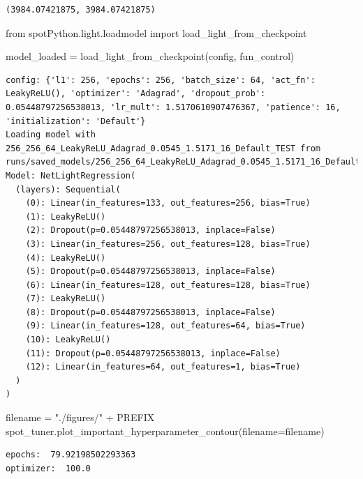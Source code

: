 \documentclass[
  letterpaper,
  DIV=11,
  numbers=noendperiod]{scrreprt}
\newenvironment{Shaded}{\begin{snugshade}}{\end{snugshade}}
\newcommand{\ImportTok}[1]{\textcolor[rgb]{0.00,0.46,0.62}{#1}}
\newcommand{\NormalTok}[1]{\textcolor[rgb]{0.00,0.23,0.31}{#1}}
\newcommand{\OperatorTok}[1]{\textcolor[rgb]{0.37,0.37,0.37}{#1}}
\newcommand{\StringTok}[1]{\textcolor[rgb]{0.13,0.47,0.30}{#1}}
\begin{document}
\begin{verbatim}
(3984.07421875, 3984.07421875)
\end{verbatim}

\begin{Shaded}
\begin{Highlighting}[]
\ImportTok{from}\NormalTok{ spotPython.light.loadmodel }\ImportTok{import}\NormalTok{ load\_light\_from\_checkpoint}

\NormalTok{model\_loaded }\OperatorTok{=}\NormalTok{ load\_light\_from\_checkpoint(config, fun\_control)}
\end{Highlighting}
\end{Shaded}

\begin{verbatim}
config: {'l1': 256, 'epochs': 256, 'batch_size': 64, 'act_fn': LeakyReLU(), 'optimizer': 'Adagrad', 'dropout_prob': 0.05448797256538013, 'lr_mult': 1.5170610907476367, 'patience': 16, 'initialization': 'Default'}
Loading model with 256_256_64_LeakyReLU_Adagrad_0.0545_1.5171_16_Default_TEST from runs/saved_models/256_256_64_LeakyReLU_Adagrad_0.0545_1.5171_16_Default_TEST/last.ckpt
Model: NetLightRegression(
  (layers): Sequential(
    (0): Linear(in_features=133, out_features=256, bias=True)
    (1): LeakyReLU()
    (2): Dropout(p=0.05448797256538013, inplace=False)
    (3): Linear(in_features=256, out_features=128, bias=True)
    (4): LeakyReLU()
    (5): Dropout(p=0.05448797256538013, inplace=False)
    (6): Linear(in_features=128, out_features=128, bias=True)
    (7): LeakyReLU()
    (8): Dropout(p=0.05448797256538013, inplace=False)
    (9): Linear(in_features=128, out_features=64, bias=True)
    (10): LeakyReLU()
    (11): Dropout(p=0.05448797256538013, inplace=False)
    (12): Linear(in_features=64, out_features=1, bias=True)
  )
)
\end{verbatim}

\begin{Shaded}
\begin{Highlighting}[]
\NormalTok{filename }\OperatorTok{=} \StringTok{"./figures/"} \OperatorTok{+}\NormalTok{ PREFIX}
\NormalTok{spot\_tuner.plot\_important\_hyperparameter\_contour(filename}\OperatorTok{=}\NormalTok{filename)}
\end{Highlighting}
\end{Shaded}

\begin{verbatim}
epochs:  79.92198502293363
optimizer:  100.0
\end{verbatim}
\end{document}
